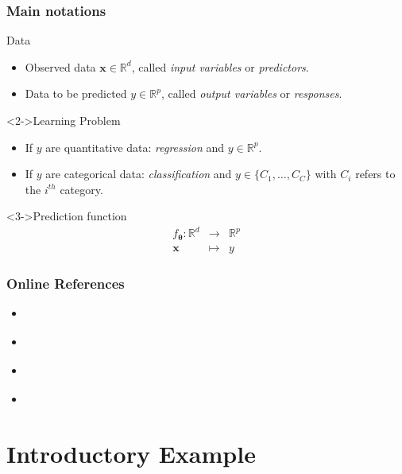 \documentclass[pressentation,10pt,aspectratio=169,xcolor=table, colorlinks=true]{beamer}
\begin{document}
\begin{frame}
  \frametitle{Main notations}
  \begin{block}{Data}
    \begin{itemize}
    \item Observed data \(\mathbf{x}\in \mathbb{R}^d\), called \emph{input variables} or \emph{predictors}.
    \item Data to be predicted \(y\in \mathbb{R}^p\), called \emph{output variables} or \emph{responses}.
    \end{itemize}
  \end{block}

  \begin{block}<2->{Learning Problem}
    \begin{itemize}
    \item If \(y\) are quantitative data: \emph{regression} and \(y\in\mathbb{R}^p\).
    \item If \(y\) are categorical data:  \emph{classification} and \(y\in\{C_1, \ldots, C_C\}\) with \(C_i\) refers to the \(i^{th}\) category.
    \end{itemize}
  \end{block}

  \begin{block}<3->{Prediction function}
    \begin{eqnarray*}
      f_{\boldsymbol{\theta}}: \mathbb{R}^d & \to & \mathbb{R}^p\\
      \mathbf{x}&  \mapsto & y
    \end{eqnarray*}
  \end{block}
\end{frame}

\begin{frame}
  \frametitle{Online References}

  \begin{itemize}
  \item \cite{zhang2021dive}
    
  \item \cite{prince2023understanding}

  \item \cite{pml1Book}

  \item \cite{pml2Book}
  \end{itemize}
  
\end{frame}

\section{Introductory Example}
\end{document}
